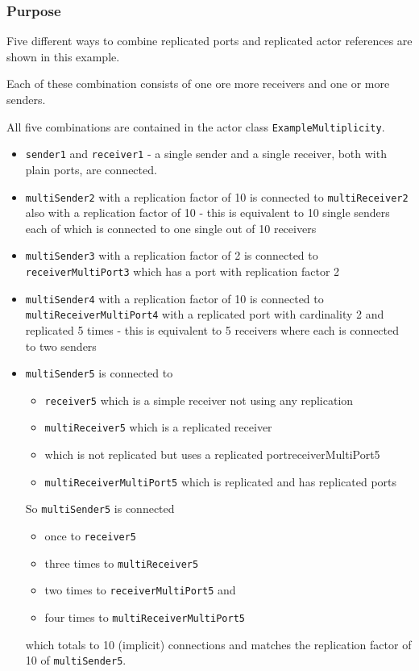 \subsubsection{Purpose}

Five different ways to combine replicated ports and replicated actor references
are shown in this example.

Each of these combination consists of one ore more receivers and one or more
senders.

All five combinations are contained in the actor class \texttt{ExampleMultiplicity}.

\begin{itemize}
\item \texttt{sender1} and \texttt{receiver1} - a single sender and a single
receiver, both with plain ports, are connected.
\item \texttt{multiSender2} with a replication factor of 10 is connected to
\texttt{multiReceiver2} also with a replication factor of 10 - this is
equivalent to 10 single senders each of which is connected to one single out
of 10 receivers
\item \texttt{multiSender3} with a replication factor of 2 is connected to
\texttt{receiverMultiPort3} which has a port with replication factor 2
\item \texttt{multiSender4} with a replication factor of 10 is connected to
\texttt{multiReceiverMultiPort4} with a replicated port with cardinality 2
and replicated 5 times - this is equivalent to 5 receivers where each is connected
to two senders
\item \texttt{multiSender5} is connected to
\begin{itemize}
\item \texttt{receiver5} which is a simple receiver not using any replication
\item \texttt{multiReceiver5} which is a replicated receiver
\item \texttt{} which is not replicated but uses a replicated portreceiverMultiPort5
\item \texttt{multiReceiverMultiPort5} which is replicated and has replicated ports
\end{itemize}
So \texttt{multiSender5} is connected
\begin{itemize}
\item once to \texttt{receiver5}
\item three times to \texttt{multiReceiver5}
\item two times to \texttt{receiverMultiPort5} and
\item four times to \texttt{multiReceiverMultiPort5}
\end{itemize}
which totals to 10 (implicit) connections and matches the replication factor of
10 of \texttt{multiSender5}.
\end{itemize}

